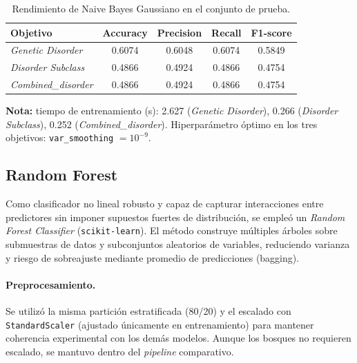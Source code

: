 \documentclass[11pt,a4paper,spanish]{book}
\numberwithin{equation}{chapter}
\numberwithin{figure}{chapter}
\begin{document}
\begin{table}[H]
\centering
\caption{Rendimiento de Naive Bayes Gaussiano en el conjunto de prueba.}
\label{tab:gnb-resultados}
\begin{tabular}{lcccc}
\toprule
\textbf{Objetivo} & \textbf{Accuracy} & \textbf{Precision} & \textbf{Recall} & \textbf{F1-score} \\
\midrule
\textit{Genetic Disorder}      & 0.6074 & 0.6048 & 0.6074 & 0.5849 \\
\textit{Disorder Subclass}     & 0.4866 & 0.4924 & 0.4866 & 0.4754 \\
\textit{Combined\_disorder}    & 0.4866 & 0.4924 & 0.4866 & 0.4754 \\
\bottomrule
\end{tabular}

\vspace{0.5em}
\footnotesize
\textbf{Nota:} tiempo de entrenamiento (s): 2.627 (\textit{Genetic Disorder}),
0.266 (\textit{Disorder Subclass}), 0.252 (\textit{Combined\_disorder}). 
Hiperparámetro óptimo en los tres objetivos: \texttt{var\_smoothing} $=10^{-9}$.
\end{table}

\subsection{Random Forest}
\label{subsec:random-forest}

Como clasificador no lineal robusto y capaz de capturar interacciones entre predictores
sin imponer supuestos fuertes de distribución, se empleó un \textit{Random Forest Classifier}
(\texttt{scikit-learn}). El método construye múltiples árboles sobre submuestras de datos y
subconjuntos aleatorios de variables, reduciendo varianza y riesgo de sobreajuste mediante
promedio de predicciones (bagging).

\paragraph{Preprocesamiento.}
Se utilizó la misma partición estratificada (80/20) y el escalado con \texttt{StandardScaler}
(ajustado únicamente en entrenamiento) para mantener coherencia experimental con los
demás modelos. Aunque los bosques no requieren escalado, se mantuvo dentro del
\textit{pipeline} comparativo.
\end{document}
